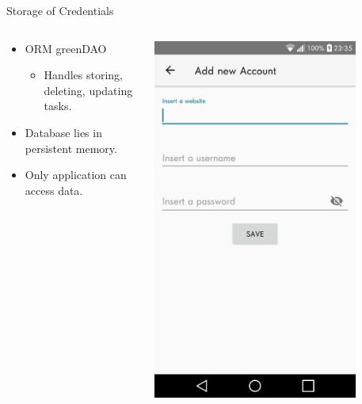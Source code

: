 \documentclass{beamer}
\begin{document}
\begin{frame}{Storage of Credentials}
\vspace{-10mm}
	\begin{columns}[onlytextwidth]
		\begin{column}{0.7\textwidth}
			\begin{itemize}
				\item ORM greenDAO
				\begin{itemize}
					\item Handles storing, deleting, updating tasks.
				\end{itemize}
				\item Database lies in persistent memory.
				\item Only application can access data.
			\end{itemize}
		\end{column}
		\begin{column}{0.3\textwidth}
			\begin{center}
			\includegraphics[width=0.8\textwidth]{images/AddAccountActivity.jpg} \\

\end{center}
\end{column}
\end{columns}
\end{frame}
\end{document}
